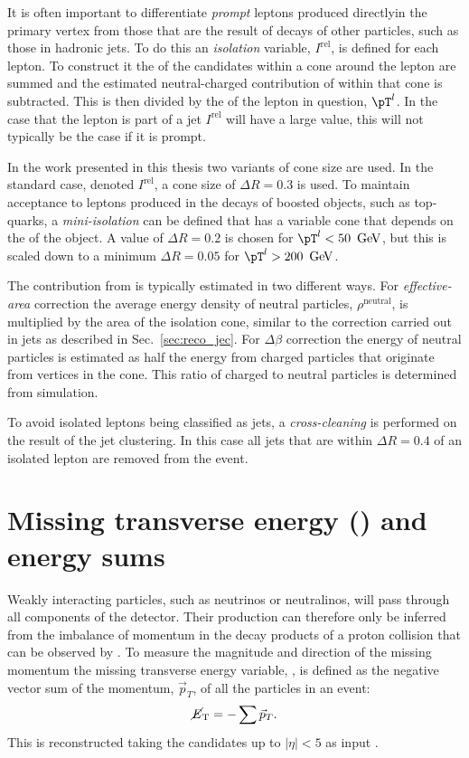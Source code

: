 It is often important to differentiate \emph{prompt} leptons produced
directlyin the primary vertex from those that are the result of decays
of other particles, such as those in hadronic jets. To do this an
\emph{isolation} variable, $I^{\textrm{rel}}$, is defined for each
lepton. To construct it  the \pT of the \PF candidates within a cone
around the lepton are summed and the estimated neutral-charged
contribution of \PU within that cone is subtracted. This is then
divided by the \pT of the lepton in question, $\pT^l$. In the case
that the lepton is part of a jet $I^{\textrm{rel}}$ will have a large
value, this will not typically be the case if it is prompt.

In the work presented in this thesis two variants of cone size are
used. In the standard case, denoted $I^{\textrm{rel}}$, a cone size
of $\Delta R=0.3$ is used. To maintain acceptance to leptons produced
in the decays of boosted objects, such as top-quarks, a
\emph{mini-isolation} can be defined that has a variable cone that
depends on the \pT of the object. A value of $\Delta R=0.2$ is chosen
for $\pT^l<50~\gev$, but this is scaled down to a minimum $\Delta
R=0.05$ for $\pT^l>200~\gev$.

The contribution from \PU is typically estimated in two different
ways. For \emph{effective-area} correction the average \PU energy
density of neutral particles, $\rho^{\textrm{neutral}}$, is multiplied
by the area of the isolation cone, similar to the \PU correction
carried out in jets as described in Sec.~\ref{sec:reco_jec}. For
\emph{$\Delta\beta$} correction the energy of neutral particles is
estimated as half the energy from charged particles that originate
from \PU vertices in the cone. This ratio of charged to neutral
particles is determined from simulation. %

To avoid isolated leptons being classified as jets, a
\emph{cross-cleaning} is performed on the result of the jet clustering.
In this case all jets that are within $\Delta R=0.4$ of an isolated
lepton are removed from the event.

\section{Missing transverse energy (\met) and energy sums}
\label{sec:met_reco}

Weakly interacting particles, such as neutrinos or neutralinos, will
pass through all components of the \CMS detector. Their production can
therefore only be inferred from the imbalance of momentum in the decay
products of a proton collision that can be observed by \CMS. To
measure the magnitude and direction of the missing momentum the
missing transverse energy variable, \met, is defined as the negative
vector sum of the momentum, $\vec{p}_T$, of all the particles in an
event:
\begin{equation}
\mbox{$\cancel{E}_\text{T}$} = -\sum{\vec{p}_T}.
\end{equation}
This is reconstructed taking the \PF candidates up to $|\eta|<5$ as
input \cite{1748-0221-10-02-P02006}. 

